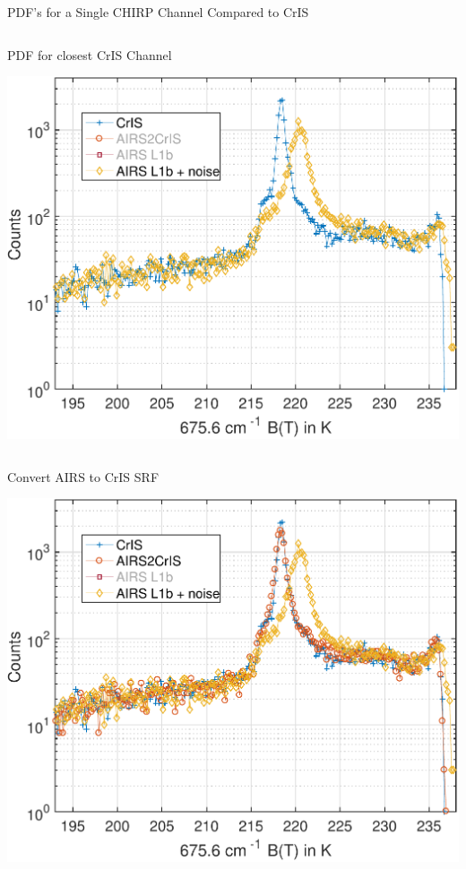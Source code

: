 \documentclass[10pt,t]{beamer}
\begin{document}
\begin{frame}[label={sec:org3f462d9}]{PDF's for a Single CHIRP Channel Compared to CrIS}
\begin{columns}
\begin{column}{0.55\columnwidth}
\begin{block}{\footnotesize PDF for closest CrIS Channel}
\vspace{-0.05in}
\vspace{-0.05in}
\begin{center}
\includegraphics[width=0.77\linewidth]{./Figs/Pdf/jun4_2015_airs_675wn_global_counts_w_airsnoise_and_cris.pdf}
\end{center}
\end{block}
\end{column}
\end{columns}

\vspace{-0.25in}

\begin{columns}
\begin{column}{0.55\columnwidth}
\begin{block}{\footnotesize Convert AIRS to CrIS SRF}
\vspace{-0.05in}
\vspace{-0.05in}
\begin{center}
\includegraphics[width=0.77\linewidth]{./Figs/Pdf/jun4_2015_airs_675wn_global_counts_w_airsnoise_and_cris_a2c.pdf}
\end{center}
\end{block}
\end{column}


\end{columns}
\end{frame}
\end{document}
